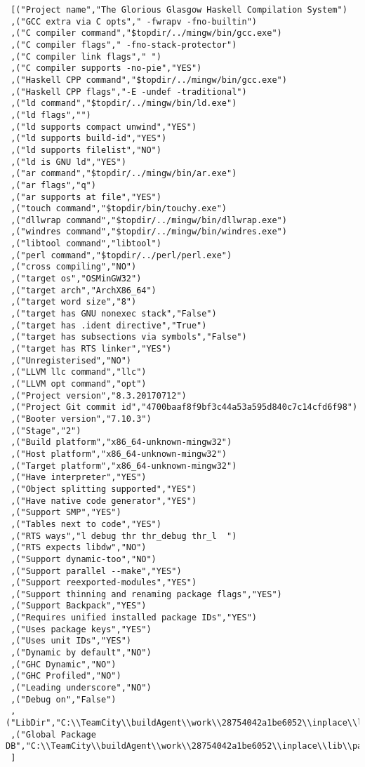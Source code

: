 \begin{verbatim}
 [("Project name","The Glorious Glasgow Haskell Compilation System")
 ,("GCC extra via C opts"," -fwrapv -fno-builtin")
 ,("C compiler command","$topdir/../mingw/bin/gcc.exe")
 ,("C compiler flags"," -fno-stack-protector")
 ,("C compiler link flags"," ")
 ,("C compiler supports -no-pie","YES")
 ,("Haskell CPP command","$topdir/../mingw/bin/gcc.exe")
 ,("Haskell CPP flags","-E -undef -traditional")
 ,("ld command","$topdir/../mingw/bin/ld.exe")
 ,("ld flags","")
 ,("ld supports compact unwind","YES")
 ,("ld supports build-id","YES")
 ,("ld supports filelist","NO")
 ,("ld is GNU ld","YES")
 ,("ar command","$topdir/../mingw/bin/ar.exe")
 ,("ar flags","q")
 ,("ar supports at file","YES")
 ,("touch command","$topdir/bin/touchy.exe")
 ,("dllwrap command","$topdir/../mingw/bin/dllwrap.exe")
 ,("windres command","$topdir/../mingw/bin/windres.exe")
 ,("libtool command","libtool")
 ,("perl command","$topdir/../perl/perl.exe")
 ,("cross compiling","NO")
 ,("target os","OSMinGW32")
 ,("target arch","ArchX86_64")
 ,("target word size","8")
 ,("target has GNU nonexec stack","False")
 ,("target has .ident directive","True")
 ,("target has subsections via symbols","False")
 ,("target has RTS linker","YES")
 ,("Unregisterised","NO")
 ,("LLVM llc command","llc")
 ,("LLVM opt command","opt")
 ,("Project version","8.3.20170712")
 ,("Project Git commit id","4700baaf8f9bf3c44a53a595d840c7c14cfd6f98")
 ,("Booter version","7.10.3")
 ,("Stage","2")
 ,("Build platform","x86_64-unknown-mingw32")
 ,("Host platform","x86_64-unknown-mingw32")
 ,("Target platform","x86_64-unknown-mingw32")
 ,("Have interpreter","YES")
 ,("Object splitting supported","YES")
 ,("Have native code generator","YES")
 ,("Support SMP","YES")
 ,("Tables next to code","YES")
 ,("RTS ways","l debug thr thr_debug thr_l  ")
 ,("RTS expects libdw","NO")
 ,("Support dynamic-too","NO")
 ,("Support parallel --make","YES")
 ,("Support reexported-modules","YES")
 ,("Support thinning and renaming package flags","YES")
 ,("Support Backpack","YES")
 ,("Requires unified installed package IDs","YES")
 ,("Uses package keys","YES")
 ,("Uses unit IDs","YES")
 ,("Dynamic by default","NO")
 ,("GHC Dynamic","NO")
 ,("GHC Profiled","NO")
 ,("Leading underscore","NO")
 ,("Debug on","False")
 ,("LibDir","C:\\TeamCity\\buildAgent\\work\\28754042a1be6052\\inplace\\lib")
 ,("Global Package DB","C:\\TeamCity\\buildAgent\\work\\28754042a1be6052\\inplace\\lib\\package.conf.d")
 ]
\end{verbatim}
